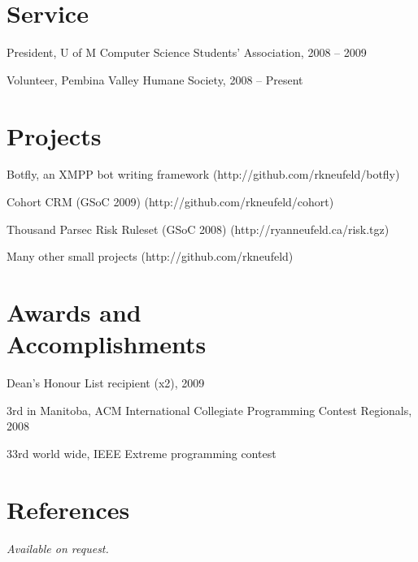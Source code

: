 \documentclass[margin,line,letterpaper]{resume}
\begin{document}
\begin{resume}
  \section{\mysidestyle Service}

  \begin{list2}
    \item President, U of M Computer Science Students' Association, 2008 -- 2009
    \item Volunteer, Pembina Valley Humane Society, 2008 -- Present
  \end{list2}

  \section{\mysidestyle Projects}

  \begin{list2}
    \item Botfly, an XMPP bot writing framework (http://github.com/rkneufeld/botfly)
    \item Cohort CRM (GSoC 2009) (http://github.com/rkneufeld/cohort)
    \item Thousand Parsec Risk Ruleset (GSoC 2008) (http://ryanneufeld.ca/risk.tgz)
    \item Many other small projects (http://github.com/rkneufeld)
  \end{list2}

  \section{\mysidestyle Awards and\\Accomplishments}

  \begin{list2}
    \item Dean's Honour List recipient (x2), 2009
    \item 3rd in Manitoba, ACM International Collegiate Programming Contest Regionals, 2008
    \item 33rd world wide, IEEE Extreme programming contest
  \end{list2}

  \section{\mysidestyle References}

  {\sl Available on request.}

\end{resume}
\end{document}
